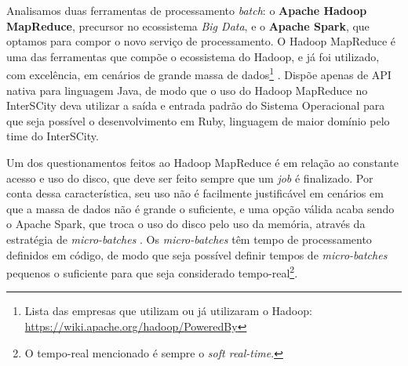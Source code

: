 Analisamos duas ferramentas de processamento \textit{batch}: o \textbf{Apache
Hadoop MapReduce}, precursor no ecossistema \textit{Big Data}, e o
\textbf{Apache Spark}, que optamos para compor o novo serviço de processamento.
O Hadoop MapReduce é uma das ferramentas que compõe o ecossistema do Hadoop, e
já foi utilizado, com excelência, em cenários de grande massa de
dados\footnote{Lista das empresas que utilizam ou já utilizaram o Hadoop:
\url{https://wiki.apache.org/hadoop/PoweredBy}} \cite{zaharia2008}.
Dispõe apenas de API nativa para linguagem Java, de modo que o uso do Hadoop
MapReduce no InterSCity deva utilizar a saída e entrada padrão do
Sistema Operacional para que seja possível o desenvolvimento em Ruby, linguagem
de maior domínio pelo time do InterSCity.

Um dos questionamentos feitos ao Hadoop MapReduce é em relação ao constante acesso e
uso do disco, que deve ser feito sempre que um \textit{job} é finalizado. Por
conta dessa característica, seu uso não é facilmente justificável em cenários em
que a massa de dados não é grande o suficiente, e uma opção válida acaba sendo
o Apache Spark, que troca o uso do disco pelo uso da memória, através da estratégia
de \textit{micro-batches} \cite{arsalan2014}. Os \textit{micro-batches} têm tempo de processamento
definidos em código, de modo que seja possível definir tempos de
\textit{micro-batches} pequenos o suficiente para que seja considerado
tempo-real\footnote{O tempo-real mencionado é sempre o \textit{soft real-time}.}.

